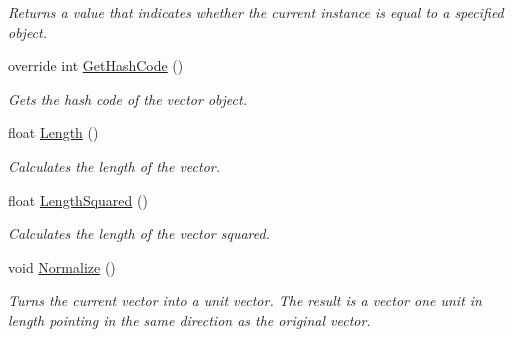 \begin{DoxyCompactItemize}
\begin{DoxyCompactList}\small\item\em Returns a value that indicates whether the current instance is equal to a specified object.\end{DoxyCompactList}\item 
override int \hyperlink{struct_microsoft_1_1_xna_1_1_framework_1_1_vector2_af5c8022711973f4cbbe011eabe01eeeb}{Get\+Hash\+Code} ()
\begin{DoxyCompactList}\small\item\em Gets the hash code of the vector object.\end{DoxyCompactList}\item 
float \hyperlink{struct_microsoft_1_1_xna_1_1_framework_1_1_vector2_a0a8efc1ce6c7139ca2d5bbe8ba540d71}{Length} ()
\begin{DoxyCompactList}\small\item\em Calculates the length of the vector.\end{DoxyCompactList}\item 
float \hyperlink{struct_microsoft_1_1_xna_1_1_framework_1_1_vector2_a6e5559b22dbd45810997ed845b88d5ef}{Length\+Squared} ()
\begin{DoxyCompactList}\small\item\em Calculates the length of the vector squared.\end{DoxyCompactList}\item 
void \hyperlink{struct_microsoft_1_1_xna_1_1_framework_1_1_vector2_ae0a4c81d525c2437d296bcd787d47572}{Normalize} ()
\begin{DoxyCompactList}\small\item\em Turns the current vector into a unit vector. The result is a vector one unit in length pointing in the same direction as the original vector.\end{DoxyCompactList}\end{DoxyCompactItemize}
